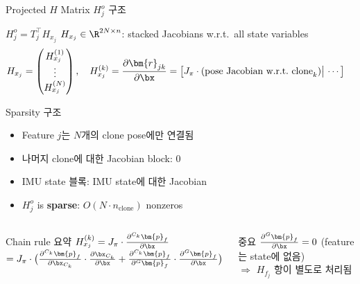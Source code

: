 \begin{frame}[shrink=10]{Projected $H$ Matrix $H_j^o$ 구조}
  \begin{block}{$H_j^o = T_j^\top H_{x_j}$}
    $H_{x_j} \in \R^{2N\times n}$: stacked Jacobians w.r.t.\ all state variables
    \begin{align*}
      H_{x_j} &= \begin{pmatrix}
        H_{x_j}^{(1)} \\ \vdots \\ H_{x_j}^{(N)}
      \end{pmatrix}, \quad
      H_{x_j}^{(k)} = \frac{\partial \bm{r}_{jk}}{\partial \bx}
      = \bigl[J_\pi \cdot \text{(pose Jacobian w.r.t.\ clone}_k)\big|\,\cdots\bigr]
    \end{align*}
  \end{block}
  \begin{block}{Sparsity 구조}
    \begin{itemize}
      \item Feature $j$는 $N$개의 clone pose에만 연결됨
      \item 나머지 clone에 대한 Jacobian block: 0
      \item IMU state 블록: IMU state에 대한 Jacobian
      \item $H_j^o$ is \textbf{sparse}: $O(N \cdot n_\text{clone})$ nonzeros
    \end{itemize}
  \end{block}
  \begin{columns}[T]
      \begin{exampleblock}{Chain rule 요약}
        $H_{x_j}^{(k)} = J_\pi \cdot \frac{\partial {}^{C_k}\bm{p}_f}{\partial \bx}$\\
        $= J_\pi \cdot \bigl(\frac{\partial {}^{C_k}\bm{p}_f}{\partial \bx_{C_k}}\cdot\frac{\partial \bx_{C_k}}{\partial \bx} + \frac{\partial {}^{C_k}\bm{p}_f}{\partial {}^G\bm{p}_f}\cdot\frac{\partial {}^G\bm{p}_f}{\partial \bx}\bigr)$
      \end{exampleblock}
      \begin{alertblock}{중요}
        $\frac{\partial {}^G\bm{p}_f}{\partial \bx} = 0$ (feature는 state에 없음)\\
        $\Rightarrow$ $H_{f_j}$ 항이 별도로 처리됨
      \end{alertblock}
  \end{columns}
\end{frame}

